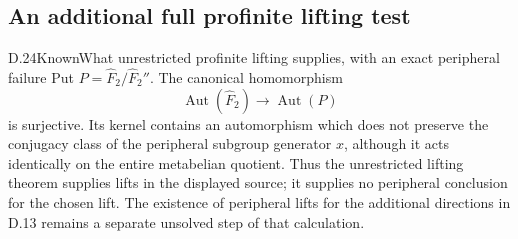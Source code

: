 \subsection{An additional full profinite lifting test}

\begin{statement}{D.24}{Known}{What unrestricted profinite lifting supplies, with an exact peripheral failure}
Put $P=\widehat F_2/\widehat F_2''$. The canonical homomorphism
\[
 \operatorname{Aut}(\widehat F_2)\longrightarrow
 \operatorname{Aut}(P)
\]
is surjective. Its kernel contains an automorphism which does not
preserve the conjugacy class of the peripheral subgroup generator
$x$, although it acts identically on the entire metabelian quotient.
Thus the unrestricted lifting theorem supplies lifts in the displayed
source; it supplies no peripheral conclusion for the chosen lift.
The existence of peripheral lifts for the additional directions in
D.13 remains a separate unsolved step of that calculation.
\end{statement}
